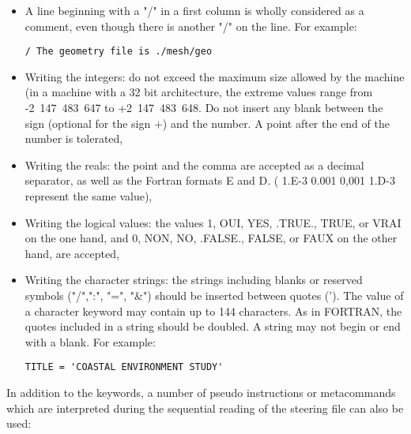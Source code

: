 \begin{itemize}
\item A line beginning with a "/" in a first column is wholly considered as a
comment, even though there is another "/" on the line. For example:

\begin{lstlisting}[language=TelemacCas]
/ The geometry file is ./mesh/geo
\end{lstlisting}

\item Writing the integers: do not exceed the maximum size allowed by the
machine (in a machine with a 32 bit architecture, the extreme values range from
-2~147~483~647 to +2~147~483~648. Do not insert any blank between the sign
(optional for the sign +) and the number. A point after the end of the number
is tolerated,

\item Writing the reals: the point and the comma are accepted as a decimal
separator, as well as the Fortran formats E and D. ( 1.E-3  0.001  0,001  1.D-3
represent the same value),

\item Writing the logical values: the values 1, OUI,  YES,  .TRUE.,  TRUE,  or
VRAI on the one hand, and 0, NON,  NO,  .FALSE.,  FALSE, or FAUX on the other
hand, are accepted,

\item Writing the character strings: the strings including blanks or reserved
symbols ("/",":", "=", "\&") should be inserted between quotes ('). The value
of a character keyword may contain up to 144 characters. As in FORTRAN, the
quotes included in a string should be doubled. A string may not begin or end
with a blank. For example:

\begin{lstlisting}[language=TelemacCas]
TITLE = 'COASTAL ENVIRONMENT STUDY'
\end{lstlisting}

\end{itemize}

In addition to the keywords, a number of pseudo instructions or metacommands
which are interpreted during the sequential reading of the steering file can
also be used:


